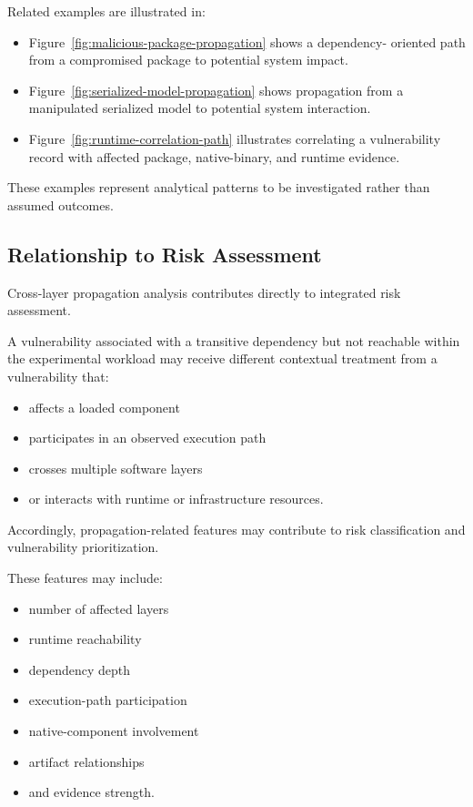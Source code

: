 \documentclass[
  12pt,
  letterpaper,
  oneside]{report}
\providecommand{\tightlist}{%
  \setlength{\itemsep}{0pt}\setlength{\parskip}{0pt}}
\begin{document}
Related examples are illustrated in:

\begin{itemize}
\item
  Figure~\ref{fig:malicious-package-propagation} shows a dependency-
  oriented path from a compromised package to potential system impact.
\item
  Figure~\ref{fig:serialized-model-propagation} shows propagation from a
  manipulated serialized model to potential system interaction.
\item
  Figure~\ref{fig:runtime-correlation-path} illustrates correlating a
  vulnerability record with affected package, native-binary, and runtime
  evidence.
\end{itemize}

These examples represent analytical patterns to be investigated rather
than assumed outcomes.

\subsection{Relationship to Risk Assessment}\label{11128-relationship-to-risk-assessment}

Cross-layer propagation analysis contributes directly to integrated risk
assessment.

A vulnerability associated with a transitive dependency but not
reachable within the experimental workload may receive different
contextual treatment from a vulnerability that:

\begin{itemize}
\tightlist
\item
  affects a loaded component
\item
  participates in an observed execution path
\item
  crosses multiple software layers
\item
  or interacts with runtime or infrastructure resources.
\end{itemize}

Accordingly, propagation-related features may contribute to risk
classification and vulnerability prioritization.

These features may include:

\begin{itemize}
\tightlist
\item
  number of affected layers
\item
  runtime reachability
\item
  dependency depth
\item
  execution-path participation
\item
  native-component involvement
\item
  artifact relationships
\item
  and evidence strength.
\end{itemize}
\end{document}
